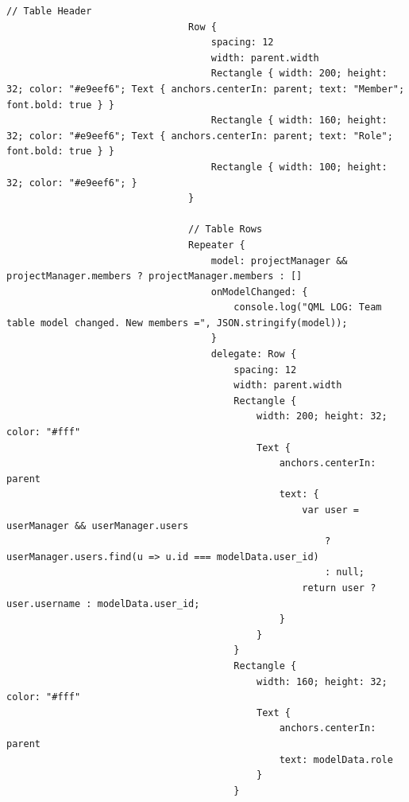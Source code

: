 \documentclass{report}
\begin{document}
\begin{lstlisting}[style=qmlstyle]
                                // Table Header
                                Row {
                                    spacing: 12
                                    width: parent.width
                                    Rectangle { width: 200; height: 32; color: "#e9eef6"; Text { anchors.centerIn: parent; text: "Member"; font.bold: true } }
                                    Rectangle { width: 160; height: 32; color: "#e9eef6"; Text { anchors.centerIn: parent; text: "Role"; font.bold: true } }
                                    Rectangle { width: 100; height: 32; color: "#e9eef6"; }
                                }

                                // Table Rows
                                Repeater {
                                    model: projectManager && projectManager.members ? projectManager.members : []
                                    onModelChanged: {
                                        console.log("QML LOG: Team table model changed. New members =", JSON.stringify(model));
                                    }
                                    delegate: Row {
                                        spacing: 12
                                        width: parent.width
                                        Rectangle {
                                            width: 200; height: 32; color: "#fff"
                                            Text {
                                                anchors.centerIn: parent
                                                text: {
                                                    var user = userManager && userManager.users
                                                        ? userManager.users.find(u => u.id === modelData.user_id)
                                                        : null;
                                                    return user ? user.username : modelData.user_id;
                                                }
                                            }
                                        }
                                        Rectangle {
                                            width: 160; height: 32; color: "#fff"
                                            Text {
                                                anchors.centerIn: parent
                                                text: modelData.role
                                            }
                                        }
                

\end{lstlisting}
\end{document}
